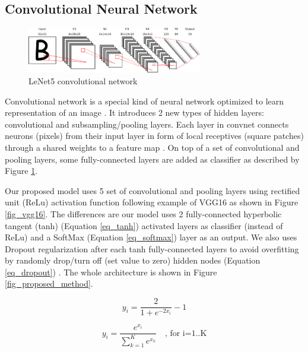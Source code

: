 \documentclass[conference, compsoc]{IEEEtran}
\begin{document}
\subsection{Convolutional Neural Network}

\begin{figure}[h]
	\begin{center}
		\includegraphics[width=3.0in]{../lenet5}
		\renewcommand{\figurename}{Fig.}		
		\caption{LeNet5 convolutional network}
		\label{fig_lenet5_convnet}
	\end{center}
\end{figure}

Convolutional network is a special kind of neural network optimized to learn representation of an image \cite{lecun2015deep}. It introduces 2 new types of hidden layers: convolutional and subsampling/pooling layers. Each layer in convnet connects neurons (pixels) from their input layer in form of local receptives (square patches) through a shared weights to a feature map \cite{lecun1998gradient}. On top of a set of convolutional and pooling layers, some fully-connected layers are added as classifier as described by Figure \ref{fig_lenet5_convnet}.

Our proposed model uses 5 set of convolutional and pooling layers using rectified unit (ReLu) activation function following example of VGG16 as shown in Figure \ref{fig_vgg16}. The differences are our model uses 2 fully-connected hyperbolic tangent (tanh) (Equation \ref{eq_tanh}) activated layers as classifier (instead of ReLu) and a SoftMax (Equation \ref{eq_softmax}) layer as an output. We also uses Dropout regularization after each tanh fully-connected layers to avoid overfitting by randomly drop/turn off (set value to zero) hidden nodes (Equation \ref{eq_dropout}) \cite{srivastava2014dropout}. The whole architecture is shown in Figure \ref{fig_proposed_method}.

\begin{equation}
y_{i}={\frac {2}{1+e^{-2x _{i}}}}-1
\label{eq_tanh}
\end{equation}

\begin{equation}
y_{i}={\frac {e^{x _{i}}}{\sum _{k=1}^K e^{x _{k}}}} \quad \text{, for i=1..K}
\label{eq_softmax}
\end{equation}
\end{document}
